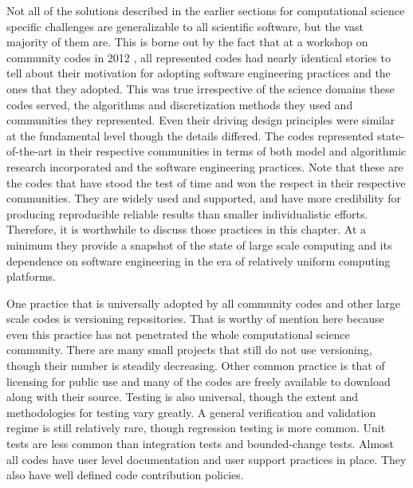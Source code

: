 \label{sec:generalization}

Not all of the solutions described in the earlier sections for
computational science
specific challenges are generalizable to all scientific software, but
the vast majority of them are. This is borne out by the fact that at a
workshop on community codes in 2012 \cite{cc2012}, all represented codes
had nearly identical stories to tell about their motivation for
adopting software engineering practices and the ones that they
adopted. This was true irrespective of the science domains these codes
served, the algorithms and discretization methods they used and
communities they represented. Even their driving design principles
were similar at the fundamental level though the details differed. The
codes represented state-of-the-art in their respective communities in
terms of both model and algorithmic research incorporated and the
software engineering practices. Note that these are the codes that
have stood the test of time and won the respect in their respective
communities. They are widely used and supported, and have more
credibility for producing reproducible reliable results than smaller
individualistic efforts. Therefore, it is worthwhile to discuss
those practices in this chapter. At a minimum they provide a snapshot
of the state of large scale computing and its dependence on software
engineering in the era of relatively uniform computing platforms. 

One practice that is universally adopted by all community codes and
other large scale codes is versioning repositories. That is worthy of
mention here because even this practice has not penetrated the whole
computational science community. There are many small projects
that still do not use versioning, though their number is steadily
decreasing. Other common practice is that of licensing for public use
and many of the codes are freely available to download along with their
source. Testing is also universal, though the extent and methodologies
for testing vary greatly. A general verification and validation regime
is still relatively rare, though regression testing is more
common. Unit tests are less common than integration tests and
bounded-change tests. Almost all codes have user level documentation
and user support practices in place. They also have well defined code
contribution policies. 

